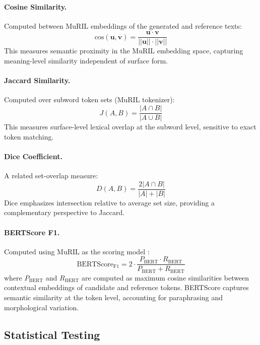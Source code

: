 \documentclass[11pt]{article}
\begin{document}
\paragraph{Cosine Similarity.}
Computed between MuRIL embeddings of the generated and reference texts:
\begin{equation}
    \text{cos}(\mathbf{u}, \mathbf{v}) = \frac{\mathbf{u} \cdot \mathbf{v}}{||\mathbf{u}|| \cdot ||\mathbf{v}||}
\end{equation}
This measures semantic proximity in the MuRIL embedding space, capturing meaning-level similarity independent of surface form.

\paragraph{Jaccard Similarity.}
Computed over subword token sets (MuRIL tokenizer):
\begin{equation}
    J(A, B) = \frac{|A \cap B|}{|A \cup B|}
\end{equation}
This measures surface-level lexical overlap at the subword level, sensitive to exact token matching.

\paragraph{Dice Coefficient.}
A related set-overlap measure:
\begin{equation}
    D(A, B) = \frac{2|A \cap B|}{|A| + |B|}
\end{equation}
Dice emphasizes intersection relative to average set size, providing a complementary perspective to Jaccard.

\paragraph{BERTScore F1.}
Computed using MuRIL as the scoring model \citep{zhang-etal-2020-bertscore}:
\begin{equation}
    \text{BERTScore}_{\text{F1}} = 2 \cdot \frac{P_{\text{BERT}} \cdot R_{\text{BERT}}}{P_{\text{BERT}} + R_{\text{BERT}}}
\end{equation}
where $P_{\text{BERT}}$ and $R_{\text{BERT}}$ are computed as maximum cosine similarities between contextual embeddings of candidate and reference tokens. BERTScore captures semantic similarity at the token level, accounting for paraphrasing and morphological variation.

\subsection{Statistical Testing}
\label{subsec:statstesting}
\end{document}
